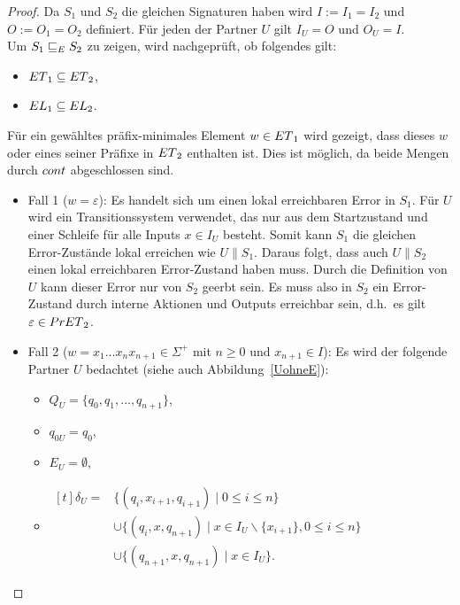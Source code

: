 \begin{proof}
  Da $S_1$ und $S_2$ die gleichen Signaturen haben wird
  $I:=I_1=I_2$ und $O:=O_1=O_2$ definiert. Für jeden der Partner $U$ gilt $I_U=O$ und
  $O_U=I$.\\
  Um $S_1\ERel S_2$ zu zeigen, wird nachgeprüft, ob folgendes gilt:
  \begin{itemize}
    \item $\ET{}_1\subseteq \ET{}_2$,
    \item $\EL{}_1\subseteq \EL{}_2$.
  \end{itemize}
  Für ein gewähltes präfix-minimales Element $w\in \ET{}_1$ wird gezeigt,
  dass dieses $w$ oder eines seiner Präfixe in $\ET{}_2$ enthalten ist.
  Dies ist möglich, da beide Mengen durch $\cont{}$ abgeschlossen sind.
  \begin{itemize}
    \item Fall 1 ($w=\varepsilon$): Es handelt sich um einen lokal erreichbaren
      Error in $S_1$.
      Für $U$ wird ein Transitionssystem verwendet, das nur aus dem Startzustand und
      einer Schleife für alle Inputs $x\in I_U$ besteht. Somit kann $S_1$ die gleichen
      Error-Zustände lokal erreichen wie $U\|S_1$. Daraus folgt, dass auch
      $U\|S_2$ einen lokal erreichbaren Error-Zustand haben muss. Durch die
      Definition von $U$ kann dieser Error nur von $S_2$ geerbt sein. Es
      muss also in $S_2$ ein Error-Zustand durch interne Aktionen und Outputs
      erreichbar sein, d.h.\ es gilt $\varepsilon\in \PrET{}_2$.
    \item Fall 2 ($w=x_1\dots x_n x_{n+1}\in\Sigma ^+$ mit $n\geq 0$ und
      $x_{n+1}\in I$): Es wird der folgende Partner $U$ bedachtet (siehe auch
      Abbildung~\ref{UohneE}):
      \begin{itemize}
        \item $Q_U=\{q_0,q_1,\dots ,q_{n+1}\}$,
        \item $q_{0U}=q_0$,
        \item $E_U=\emptyset$,
        \item $\begin{aligned}[t]
            \delta _U=&\{(q_i,x_{i+1},q_{i+1})\mid  0\leq i\leq n\}\\
                      &\cup\{(q_i,x,q_{n+1})\mid  x\in I_U\backslash\{x_{i+1}\},
          0\leq i\leq n\}\\
          &\cup\{(q_{n+1},x,q_{n+1})\mid  x\in I_U\}.
        \end{aligned}$
      \end{itemize}
      \begin{figure} [h!tbp]
      \begin{center}
        \begin{tikzpicture}[->, >=latex',auto,node distance =3cm, semithick]


\end{tikzpicture}
\end{center}
\end{figure}
\end{itemize}
\end{proof}
